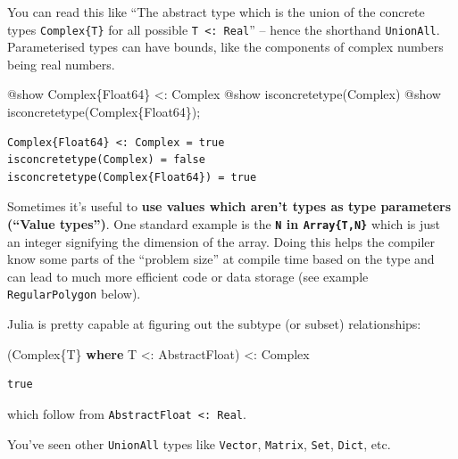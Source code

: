 \documentclass[
]{article}
\newenvironment{Shaded}{\begin{snugshade}}{\end{snugshade}}
\newcommand{\DataTypeTok}[1]{\textcolor[rgb]{0.68,0.00,0.00}{#1}}
\newcommand{\FunctionTok}[1]{\textcolor[rgb]{0.28,0.35,0.67}{#1}}
\newcommand{\KeywordTok}[1]{\textcolor[rgb]{0.00,0.23,0.31}{\textbf{#1}}}
\newcommand{\NormalTok}[1]{\textcolor[rgb]{0.00,0.23,0.31}{#1}}
\newcommand{\OperatorTok}[1]{\textcolor[rgb]{0.37,0.37,0.37}{#1}}
\newcommand{\PreprocessorTok}[1]{\textcolor[rgb]{0.68,0.00,0.00}{#1}}
\begin{document}
You can read this like ``The abstract type which is the union of the
concrete types \texttt{Complex\{T\}} for all possible
\texttt{T\ \textless{}:\ Real}'' -- hence the shorthand
\texttt{UnionAll}. Parameterised types can have bounds, like the
components of complex numbers being real numbers.

\begin{Shaded}
\begin{Highlighting}[]
\PreprocessorTok{@show} \DataTypeTok{Complex}\NormalTok{\{}\DataTypeTok{Float64}\NormalTok{\} }\OperatorTok{\textless{}:}\DataTypeTok{ Complex}
\PreprocessorTok{@show} \FunctionTok{isconcretetype}\NormalTok{(}\DataTypeTok{Complex}\NormalTok{)}
\PreprocessorTok{@show} \FunctionTok{isconcretetype}\NormalTok{(}\DataTypeTok{Complex}\NormalTok{\{}\DataTypeTok{Float64}\NormalTok{\});}
\end{Highlighting}
\end{Shaded}

\begin{verbatim}
Complex{Float64} <: Complex = true
isconcretetype(Complex) = false
isconcretetype(Complex{Float64}) = true
\end{verbatim}

Sometimes it's useful to \textbf{use values which aren't types as type
parameters (``Value types'')}. One standard example is the
\textbf{\texttt{N} in \texttt{Array\{T,N\}}} which is just an integer
signifying the dimension of the array. Doing this helps the compiler
know some parts of the ``problem size'' at compile time based on the
type and can lead to much more efficient code or data storage (see
example \texttt{RegularPolygon} below).

Julia is pretty capable at figuring out the subtype (or subset)
relationships:

\begin{Shaded}
\begin{Highlighting}[]
\NormalTok{(}\DataTypeTok{Complex}\NormalTok{\{T\} }\KeywordTok{where}\NormalTok{ T }\OperatorTok{\textless{}:}\DataTypeTok{ AbstractFloat}\NormalTok{) }\OperatorTok{\textless{}:}\DataTypeTok{ Complex}
\end{Highlighting}
\end{Shaded}

\begin{verbatim}
true
\end{verbatim}

which follow from \texttt{AbstractFloat\ \textless{}:\ Real}.

You've seen other \texttt{UnionAll} types like \texttt{Vector},
\texttt{Matrix}, \texttt{Set}, \texttt{Dict}, etc.
\end{document}
